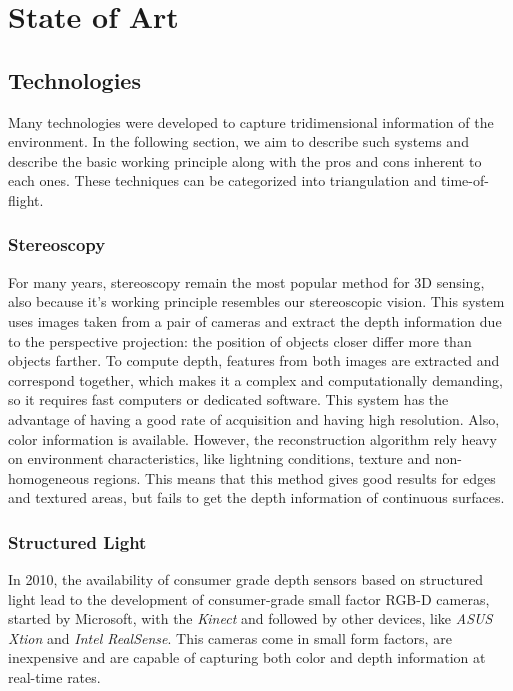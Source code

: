 \chapter{State of Art}

\section{Technologies}

Many technologies were developed to capture tridimensional information of the environment. In the following section, we aim to describe such systems and describe the basic working principle along with the pros and cons inherent to each ones. These techniques can be categorized into triangulation and time-of-flight.

\subsection{Stereoscopy}

For many years, stereoscopy remain the most popular method for 3D sensing, also because it's working principle resembles our stereoscopic vision. This system uses images taken from a pair of cameras and extract the depth information due to the perspective projection: the position of objects closer differ more than objects farther. To compute depth, features from both images are extracted and correspond together, which makes it a complex and computationally demanding, so it requires fast computers or dedicated software. This system has the advantage of having a good rate of acquisition and having high resolution. Also, color information is available. However, the reconstruction algorithm rely heavy on environment characteristics, like lightning conditions, texture and non-homogeneous regions\cite{klimentjew2010}. This means that this method gives good results for edges and textured areas, but fails to get the depth information of continuous surfaces.

\subsection{Structured Light}

In 2010, the availability of consumer grade depth sensors based on structured light lead to the development of consumer-grade small factor RGB-D cameras, started by Microsoft, with the \textit{Kinect} and followed by other devices, like \textit{ASUS Xtion} and \textit{Intel RealSense}. This cameras come in small form factors, are inexpensive and are capable of capturing both color and depth information at real-time rates\cite{zollhoefer2018}.

